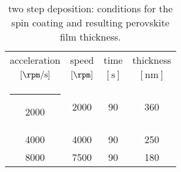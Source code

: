 		\begin{table}%
			\caption{ two step deposition: conditions for the  spin coating and resulting perovskite film thickness.}\label{mapi_thickness}
			\begin{center}
				\begin{tabular}{c c c | c}
					acceleration        & speed         & time        & thickness    \\
					$[\si{\rpm\per\s}]$ & $[\si{\rpm}]$ & $[\si{\s}]$ & $[\si{\nm}]$ \\[1mm]
					\hline
					\rule[0ex]{-4pt}{3ex}
					2000                & 2000          & 90          & 360          \\
					4000                & 4000          & 90          & 250          \\
					8000                & 7500          & 90          & 180          \\
				\end{tabular}
			\end{center}
		\end{table}


